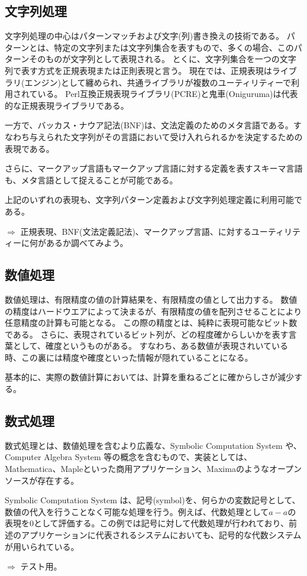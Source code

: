 \subsection{文字列処理}
文字列処理の中心はパターンマッチおよび文字(列)書き換えの技術である。
パターンとは、特定の文字列または文字列集合を表すもので、多くの場合、このパターンそのものが文字列として表現される。
とくに、文字列集合を一つの文字列で表す方式を正規表現または正則表現と言う。
現在では、正規表現はライブラリ(エンジン)として纏められ、共通ライブラリが複数のユーティリティーで利用されている。
Perl互換正規表現ライブラリ(PCRE)と鬼車(Oniguruma)は代表的な正規表現ライブラリである。

一方で、バッカス・ナウア記法(BNF)は、文法定義のためのメタ言語である。すなわち与えられた文字列がその言語において受け入れられるかを決定するための表現である。

さらに、マークアップ言語もマークアップ言語に対する定義を表すスキーマ言語も、メタ言語として捉えることが可能である。

上記のいずれの表現も、文字列パターン定義および文字列処理定義に利用可能である。
\begin{breakbox}$\Rightarrow$
正規表現、BNF(文法定義記法)、マークアップ言語、に対するユーティリティーに何があるか調べてみよう。
\end{breakbox}

\subsection{数値処理}
数値処理は、有限精度の値の計算結果を、有限精度の値として出力する。
数値の精度はハードウエアによって決まるが、有限精度の値を配列させることにより任意精度の計算も可能となる。
この際の精度とは、純粋に表現可能なビット数である。
さらに、表現されているビット列が、どの程度確からしいかを表す言葉として、確度というものがある。
すなわち、ある数値が表現されいている時、この裏には精度や確度といった情報が隠れていることになる。

基本的に、実際の数値計算においては、計算を重ねるごとに確からしさが減少する。

\subsection{数式処理}
数式処理とは、数値処理を含むより広義な、Symbolic Computation System や、Computer Algebra System 等の概念を含むもので、実装としては、Mathematica、Mapleといった商用アプリケーション、Maximaのようなオープンソースが存在する。

Symbolic Computation System は、記号(symbol)を、何らかの変数記号として、数値の代入を行うことなく可能な処理を行う。例えば、代数処理として$a - a$の表現を$0$として評価する。この例では記号に対して代数処理が行われており、前述のアプリケーションに代表されるシステムにおいても、記号的な代数システムが用いられている。

\begin{breakbox}$\Rightarrow$
テスト用。
\end{breakbox}
